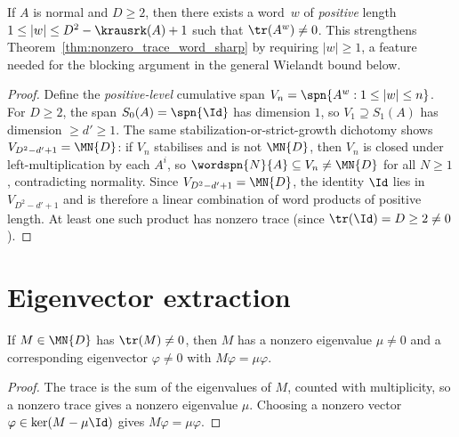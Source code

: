 \begin{theorem}%
    \label{thm:nonzero_trace_word_sharp_pos}
    \leanok
    If $A$ is normal and $D \ge 2$, then there exists a word~$w$
    of \emph{positive} length $1 \le |w| \le D^2 - \krausrk(A) + 1$
    such that $\tr(A^w) \neq 0$.
    This strengthens
    Theorem~\ref{thm:nonzero_trace_word_sharp} by requiring
    $|w| \ge 1$, a feature needed for the blocking argument in the
    general Wielandt bound below.
\end{theorem}

\begin{proof}
    \leanok
    Define the \emph{positive-level} cumulative span
    $V_n = \spn\{A^w : 1 \le |w| \le n\}$.
    For $D \ge 2$, the span $S_0(A) = \spn\{\Id\}$ has dimension $1$,
    so $V_1 \supseteq S_1(A)$ has dimension $\ge d' \ge 1$.
    The same stabilization-or-strict-growth dichotomy shows
    $V_{D^2 - d' + 1} = \MN{D}$:
    if $V_n$ stabilises and is not $\MN{D}$, then
    $V_n$ is closed under left-multiplication by each $A^i$,
    so $\wordspn{N}{A} \subseteq V_n \neq \MN{D}$
    for all $N \ge 1$, contradicting normality.
    Since $V_{D^2 - d' + 1} = \MN{D}$, the identity $\Id$ lies in
    $V_{D^2 - d' + 1}$ and is therefore a linear combination of word products of
    positive length. At least one such product has nonzero trace
    (since $\tr(\Id) = D \ge 2 \neq 0$).
\end{proof}

\section{Eigenvector extraction}

\begin{theorem}\label{thm:eigenvector_from_trace}
    \leanok
    If $M \in \MN{D}$ has $\tr(M) \neq 0$, then $M$ has a
    nonzero eigenvalue $\mu \neq 0$ and a corresponding eigenvector
    $\varphi \neq 0$ with $M \varphi = \mu \varphi$.
\end{theorem}

\begin{proof}
    \leanok
    The trace is the sum of the eigenvalues of $M$, counted with multiplicity,
    so a nonzero trace gives a nonzero eigenvalue $\mu$.  Choosing a nonzero
    vector $\varphi\in\ker(M-\mu\Id)$ gives $M\varphi=\mu\varphi$.
\end{proof}

